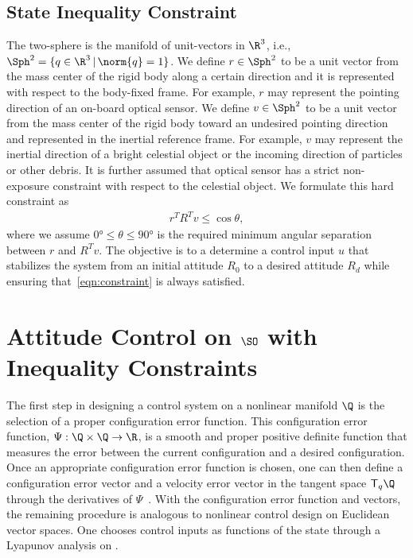 \subsection{State Inequality Constraint}

The two-sphere is the manifold of unit-vectors in \( \R^3 \), i.e., \( \Sph^2 = \{ q \in \R^3 \,  \vert \, \norm{q} = 1 \}\).
We define \( r \in \Sph^2 \) to be a unit vector from the mass center of the rigid body along a certain direction and it is represented with respect to the body-fixed frame.
For example, \( r \) may represent the pointing direction of an on-board optical sensor.
We define \( v \in \Sph^2 \) to be a unit vector from the mass center of the rigid body toward an undesired pointing direction and represented in the inertial reference frame.
For example, \( v \) may represent the inertial direction of a bright celestial object or the incoming direction of particles or other debris.
It is further assumed that optical sensor has a strict non-exposure constraint with respect to the celestial object.
We formulate this hard constraint as
\begin{align}
	r^T R^T v \leq \cos \theta , \label{eqn:constraint}
\end{align}
where we assume \( \ang{0} \leq \theta \leq \ang{90}  \) is the required minimum angular separation between \( r \) and \( R^T v \). 
The objective is to a determine a control input \( u \) that stabilizes the system from an initial attitude \( R_0 \) to a desired attitude \( R_d \) while ensuring that~\cref{eqn:constraint} is always satisfied.
\squeezeup
\section{Attitude Control on $\SO$ with Inequality Constraints}\label{sec:attitude_control}

The first step in designing a control system on a nonlinear manifold \( \Q \) is the selection of a proper configuration error function. 
This configuration error function, \( \Psi : \Q \times \Q \to \R \), is a smooth and proper positive definite function that measures the error between the current configuration and a desired configuration. 
Once an appropriate configuration error function is chosen, one can then define a configuration error vector and a velocity error vector in the tangent space \( \mathsf{T}_q \Q \) through the derivatives of \( \Psi \)~\cite{bullo2004}. 
With the configuration error function and vectors, the remaining procedure is analogous to nonlinear control design on Euclidean vector spaces. 
One chooses control inputs as functions of the state through a Lyapunov analysis on \Q.

